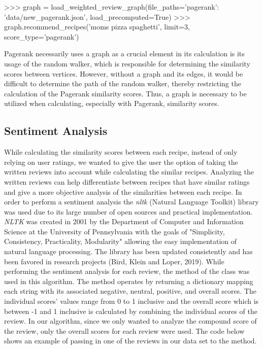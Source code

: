 \documentclass[fontsize=11pt]{article}
\begin{document}
\begin{python}
>>> graph = load_weighted_review_graph(file_paths={'pagerank': 'data/new_pagerank.json'}, load_precomputed=True)
>>> graph.recommend_recipes('moms pizza spaghetti', limit=3, score_type='pagerank')
\end{python}

Pagerank necessarily uses a graph as a crucial element in its calculation is its usage of the random walker, which is responsible for determining the similarity scores between vertices. However, without a graph and its edges, it would be difficult to determine the path of the random walker, thereby restricting the calculation of the Pagerank similarity scores. Thus, a graph is necessary to be utilized when calculating, especially with Pagerank, similarity scores. 

\subsection{Sentiment Analysis}
While calculating the similarity scores between each recipe, instead of only relying on user ratings, we wanted to give the user the option of taking the written reviews into account while calculating the similar recipes. Analyzing the written reviews can help differentiate between recipes that have similar ratings and give a more objective analysis of the similarities between each recipe. In order to perform a sentiment analysis the {\em nltk} (Natural Language Toolkit) library was used due to its large number of open sources and practical implementation. {\em NLTK} was created in 2001 by the Department of Computer and Information Science at the University of Pennsylvania with the goals of "Simplicity, Consistency, Practicality, Modularity" allowing the easy implementation of natural language processing. The library has been updated consistently and has been favored in research projects (Bird, Klein and Loper, 2019). While performing the sentiment analysis for each review, the  method of the  class was used in this algorithm. The  method operates by returning a dictionary mapping each string with its associated negative, neutral, positive, and overall scores. The individual scores' values range from 0 to 1 inclusive and the overall score which is between -1 and 1 inclusive is calculated by combining the individual scores of the review. In our algorithm, since we only wanted to analyze the compound score of the review, only the overall scores for each review were used. The code below shows an example of passing in one of the reviews in our data set to the  method.
\end{document}
